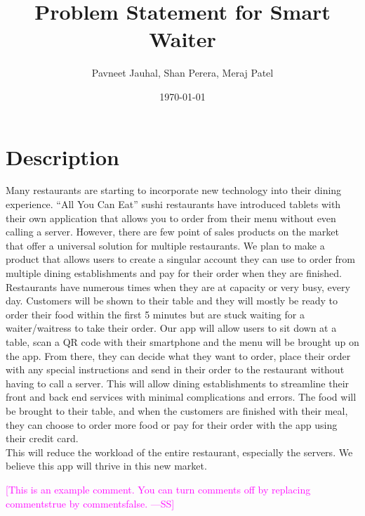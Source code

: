 \documentclass[12pt]{article}
\newcommand{\authornote}[3]{\textcolor{#1}{[#3 ---#2]}}
\newcommand{\authornote}[3]{}
\newcommand{\wss}[1]{\authornote{magenta}{SS}{#1}}
\begin{document}
\title{Problem Statement for Smart Waiter} 
\author{Pavneet Jauhal, Shan Perera, Meraj Patel}
\date{\today}

\maketitle
\section*{Description}

Many restaurants are starting to incorporate new technology into their dining experience. ``All You Can Eat'' sushi restaurants have introduced tablets with their own application that allows you to order from their menu without even calling a server. However, there are few point of sales products on the market that offer a universal solution for multiple restaurants. We plan to make a product that allows users to create a singular account they can use to order from multiple dining establishments and pay for their order when they are finished.\\

	Restaurants have numerous times when they are at capacity or very busy, every day. Customers will be shown to their table and they will mostly be ready to order their food within the first 5 minutes but are stuck waiting for a waiter/waitress to take their order. Our app will allow users to sit down at a table, scan a QR code with their smartphone and the menu will be brought up on the app. From there, they can decide what they want to order, place their order with any special instructions and send in their order to the restaurant without having to call a server. This will allow dining establishments to streamline their front and back end services with minimal complications and errors. The food will be brought to their table, and when the customers are finished with their meal, they can choose to order more food or pay for their order with the app using their credit card.\\
	
	This will reduce the workload of the entire restaurant, especially the servers. We believe this app will thrive in this new market.

\wss{This is an example comment.  You can turn comments off by replacing
  commentstrue by commentsfalse.}
\end{document}
